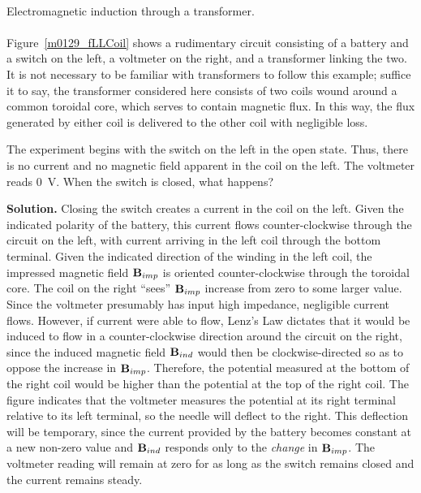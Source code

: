 ~\\ \begin{example} 
\begin{mdframed}[backgroundcolor=brown!20,linecolor=brown!20]\raggedright
Electromagnetic induction through a transformer.
\\~\\
Figure~\ref{m0129_fLLCoil} shows a rudimentary circuit consisting of a battery and a switch on the left, a voltmeter on the right, and a transformer linking the two.
It is not necessary to be familiar with transformers to follow this example; suffice it to say, the transformer considered here consists of two coils wound around a common toroidal core, which serves to contain magnetic flux.  In this way, the flux generated by either coil is delivered to the other coil with negligible loss.

The experiment begins with the switch on the left in the open state.  
Thus, there is no current and no magnetic field apparent in the coil on the left.
The voltmeter reads 0~V.
When the switch is closed, what happens?

{\bf Solution.}  Closing the switch creates a current in the coil on the left. 
Given the indicated polarity of the battery, this current flows counter-clockwise through the circuit on the left, with current arriving in the left coil through the bottom terminal. 
Given the indicated direction of the winding in the left coil, the impressed magnetic field ${\bf B}_{imp}$ is oriented counter-clockwise through the toroidal core. 
The coil on the right ``sees'' ${\bf B}_{imp}$ increase from zero to some larger value.
Since the voltmeter presumably has input high impedance, negligible current flows.
However, if current were able to flow, Lenz's Law dictates that it would be induced to flow in a counter-clockwise direction around the circuit on the right, since the induced magnetic field ${\bf B}_{ind}$ would then be clockwise-directed so as to oppose the increase in ${\bf B}_{imp}$.
Therefore, the potential measured at the bottom of the right coil would be higher than the potential at the top of the right coil. 
The figure indicates that the voltmeter measures the potential at its right terminal relative to its left terminal, so the needle will deflect to the right.
This deflection will be temporary, since the current provided by the battery becomes constant at a new non-zero value and ${\bf B}_{ind}$ responds only to the \emph{change} in ${\bf B}_{imp}$.  
The voltmeter reading will remain at zero for as long as the switch remains closed and the current remains steady.


\end{mdframed}
\end{example}
